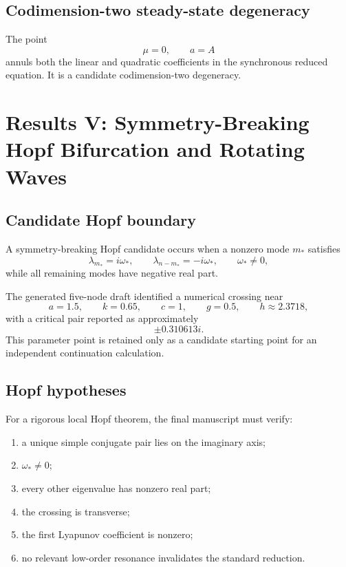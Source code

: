 \documentclass[11pt, reqno]{amsart}
\theoremstyle{definition}
\theoremstyle{remark}
\begin{document}
	\subsection{Codimension-two steady-state degeneracy}
	
	The point
	\[
	\mu=0,
	\qquad
	a=A
	\]
	annuls both the linear and quadratic coefficients in the synchronous reduced
	equation.  It is a candidate codimension-two degeneracy.
	
	
	\section{Results V: Symmetry-Breaking Hopf Bifurcation and Rotating Waves}
	\label{sec:hopf}
	
	\subsection{Candidate Hopf boundary}
	
	A symmetry-breaking Hopf candidate occurs when a nonzero mode $m_*$ satisfies
	\begin{equation}
		\label{eq:hopf-spectral}
		\lambda_{m_*}=i\omega_*,
		\qquad
		\lambda_{n-m_*}=-i\omega_*,
		\qquad
		\omega_*\ne0,
	\end{equation}
	while all remaining modes have negative real part.
	
	The generated five-node draft identified a numerical crossing near
	\[
	a=1.5,
	\qquad
	k=0.65,
	\qquad
	c=1,
	\qquad
	g=0.5,
	\qquad
	h\approx2.3718,
	\]
	with a critical pair reported as approximately
	\[
	\pm0.310613i.
	\]
	This parameter point is retained only as a candidate starting point for an
	independent continuation calculation.
	
	
	\subsection{Hopf hypotheses}
	
	For a rigorous local Hopf theorem, the final manuscript must verify:
	\begin{enumerate}[label=(H\arabic*),leftmargin=3em]
		\item a unique simple conjugate pair lies on the imaginary axis;
		\item $\omega_*\ne0$;
		\item every other eigenvalue has nonzero real part;
		\item the crossing is transverse;
		\item the first Lyapunov coefficient is nonzero;
		\item no relevant low-order resonance invalidates the standard reduction.
	\end{enumerate}
	
\end{document}
